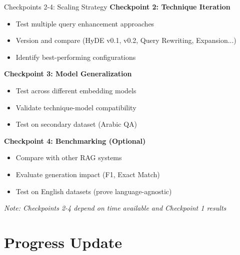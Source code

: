 \documentclass[aspectratio=169]{beamer}
\begin{document}
\begin{frame}{Checkpoints 2-4: Scaling Strategy}
\textbf{Checkpoint 2: Technique Iteration}
\begin{itemize}
    \item Test multiple query enhancement approaches
    \item Version and compare (HyDE v0.1, v0.2, Query Rewriting, Expansion...)
    \item Identify best-performing configurations
\end{itemize}

\vspace{0.3cm}

\textbf{Checkpoint 3: Model Generalization}
\begin{itemize}
    \item Test across different embedding models
    \item Validate technique-model compatibility
    \item Test on secondary dataset (Arabic QA)
\end{itemize}

\vspace{0.3cm}

\textbf{Checkpoint 4: Benchmarking (Optional)}
\begin{itemize}
    \item Compare with other RAG systems
    \item Evaluate generation impact (F1, Exact Match)
    \item Test on English datasets (prove language-agnostic)
\end{itemize}

\vspace{0.3cm}

\textit{Note: Checkpoints 2-4 depend on time available and Checkpoint 1 results}
\end{frame}

\section{Progress Update}
\end{document}
